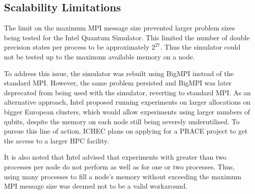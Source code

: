 
\subsection{Scalability Limitations}
\label{sec:scalability_limitations}
The limit on the maximum MPI message size prevented larger problem sizes being tested for the Intel Quantum Simulator. This limited the number of double precision states per process to be approximately $2^{27}$. Thus the simulator could not be tested up to the maximum available memory on a node.

To address this issue, the simulator was rebuilt using BigMPI instead of the standard MPI. However, the same problem persisted and BigMPI was later deprecated from being used with the simulator, reverting to standard MPI. As an alternative approach, Intel proposed running experiments on larger allocations on bigger European clusters, which would allow experiments using larger numbers of qubits, despite the memory on each node still being severely underutilised. To pursue this line of action, ICHEC plans on applying for a PRACE project to get the access to a larger HPC facility.

It is also noted that Intel advised that experiments with greater than two processes per node do not perform as well as for one or two processes. Thus, using many processes to fill a node's memory without exceeding the maximum MPI message size was deemed not to be a valid workaround.